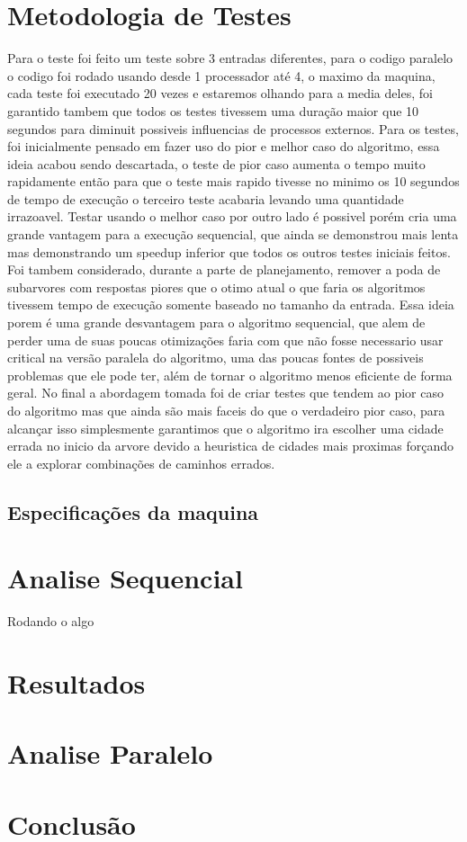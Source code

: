 \documentclass[a4paper,12pt]{article}
\begin{document}
    \section{Metodologia de Testes}
        Para o teste foi feito um teste sobre 3 entradas diferentes, para o codigo paralelo o codigo foi rodado usando desde 1 processador até 4, o maximo da maquina, cada teste foi executado 20 vezes e estaremos olhando para a media deles,
        foi garantido tambem que todos os testes tivessem uma duração maior que 10 segundos para diminuit possiveis influencias de processos externos.
        Para os testes, foi inicialmente pensado em fazer uso do pior e melhor caso do algoritmo, essa ideia acabou sendo descartada, o teste de pior caso aumenta o tempo muito rapidamente
        então para que o teste mais rapido tivesse no minimo os 10 segundos de tempo de execução o terceiro teste acabaria levando uma quantidade irrazoavel. Testar usando o melhor caso por outro lado é possivel porém 
        cria uma grande vantagem para a execução sequencial, que ainda se demonstrou mais lenta mas demonstrando um speedup inferior que todos os outros testes iniciais feitos.
        Foi tambem considerado, durante a parte de planejamento, remover a poda de subarvores com respostas piores que o otimo atual
        o que faria os algoritmos tivessem tempo de execução somente baseado no tamanho da entrada. Essa ideia porem é uma grande desvantagem para o algoritmo sequencial, que alem de perder uma de suas 
        poucas otimizações faria com que não fosse necessario usar critical na versão paralela do algoritmo, uma das poucas fontes de possiveis problemas que ele pode ter, além de tornar o algoritmo menos eficiente de forma geral.
        No final a abordagem tomada foi de criar testes que tendem ao pior caso do algoritmo mas que ainda são mais faceis do que o verdadeiro pior caso, para alcançar isso
        simplesmente garantimos que o algoritmo ira escolher uma cidade errada no inicio da arvore devido a heuristica de cidades mais proximas forçando ele a explorar combinações de caminhos errados. 
        \subsection{Especificações da maquina}
    \section{Analise Sequencial}
    Rodando o algo

    \section{Resultados}
    \section{Analise Paralelo}
    \section{Conclusão}
\end{document}
